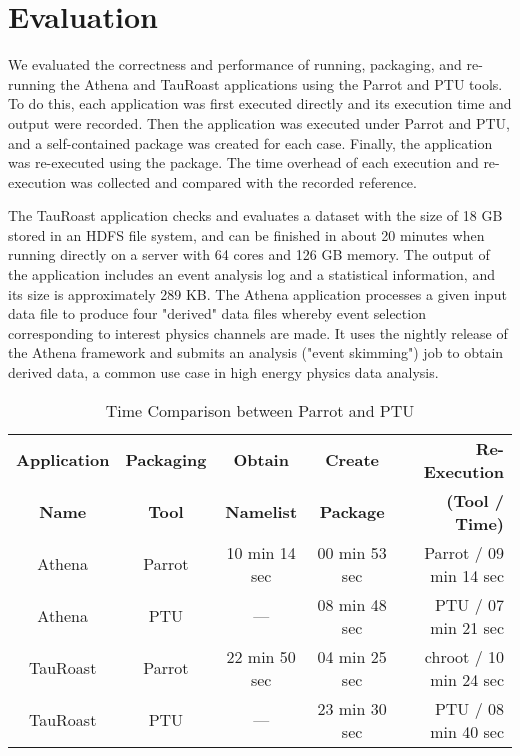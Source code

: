 \section{Evaluation}

We evaluated the correctness and performance of running, packaging, and re-running the Athena and TauRoast applications using the Parrot and PTU tools.
To do this, each application was first executed directly and its execution time and output were recorded. Then the application was executed under Parrot and PTU, and a self-contained package was created for each case. Finally, the application was re-executed using the package. The time overhead of each execution and re-execution was collected and compared with the recorded reference.

The TauRoast application checks and evaluates a dataset with the size of 18 GB stored in an HDFS file system, and can be finished in about 20 minutes when running directly on a server with 64 cores and 126 GB memory. The output of the application includes an event analysis log and a statistical information, and its size is approximately 289 KB. The Athena application processes a given input data file to produce four "derived" data files whereby event selection corresponding to interest physics channels are made. It uses the nightly release of the Athena framework and submits an analysis ("event skimming") job to obtain derived data, a common use case in high energy physics data analysis.

\begin{table}
\small
    \centering
    \begin{tabular}{ccccr}
    \hline
    \bf Application & \bf Packaging & \bf Obtain	& \bf Create & \bf Re-Execution \\
	\bf Name		& \bf Tool		& \bf Namelist	& \bf Package& \bf (Tool / Time) \\ \hline
	Athena & Parrot & 10 min 14 sec & 00 min 53 sec & Parrot / 09 min 14 sec  \\ \hline
	Athena & PTU & --- & 08 min 48 sec & PTU / 07 min 21 sec  \\ \hline
	TauRoast & Parrot & 22 min 50 sec  & 04 min 25 sec &chroot / 10 min 24 sec \\ \hline
	TauRoast & PTU & --- & 23 min 30 sec & PTU / 08 min 40 sec \\ \hline 
    \end{tabular}
    \normalsize
    \caption{Time Comparison between Parrot and PTU}
    \label{table:parrot_ptu}
\end{table}    

